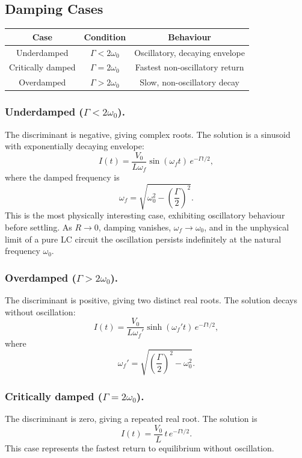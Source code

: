 \documentclass{article}
\begin{document}
\subsection{Damping Cases}
\begin{center}
    \begin{tabular}{|c|c|c|}
    \hline
    Case & Condition & Behaviour \\
    \hline
    Underdamped   & $\Gamma < 2\omega_0$ & Oscillatory, decaying envelope \\
    \hline
    Critically damped & $\Gamma = 2\omega_0$ & Fastest non-oscillatory return \\
    \hline
    Overdamped    & $\Gamma > 2\omega_0$ & Slow, non-oscillatory decay \\
    \hline
    \end{tabular}
\end{center}

\subsubsection{Underdamped ($\Gamma < 2\omega_0$).}
The discriminant is negative, giving complex roots. The solution is a sinusoid with exponentially decaying envelope:
\[I(t) = \frac{V_0}{L\omega_f}\sin(\omega_f t)\,e^{-\Gamma t/2},\]
where the damped frequency is
\[\omega_f = \sqrt{\omega_0^2 - \left(\frac{\Gamma}{2}\right)^2}.\]
This is the most physically interesting case, exhibiting oscillatory behaviour before settling. As $R \to 0$, damping vanishes, $\omega_f \to \omega_0$, and in the unphysical limit of a pure LC circuit the oscillation persists indefinitely at the natural frequency $\omega_0$.

\subsubsection{Overdamped ($\Gamma > 2\omega_0$).}
The discriminant is positive, giving two distinct real roots. The solution decays without oscillation:
\[I(t) = \frac{V_0}{L\omega_f'}\sinh(\omega_f' t)\,e^{-\Gamma t/2},\]
where
\[\omega_f' = \sqrt{\left(\frac{\Gamma}{2}\right)^2 - \omega_0^2}.\]

\subsubsection{Critically damped ($\Gamma = 2\omega_0$).}
The discriminant is zero, giving a repeated real root. The solution is
\[I(t) = \frac{V_0}{L}\,t\,e^{-\Gamma t/2}.\]
This case represents the fastest return to equilibrium without oscillation.
\end{document}
